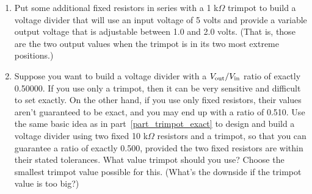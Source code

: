 \begin{enumerate}[wide]
\item Put some additional fixed resistors in series with a 1 k$\Omega$ trimpot to build a voltage divider that will use an input voltage of 5 volts and provide a variable output voltage that is adjustable between 1.0 and 2.0 volts.  (That is, those are the two output values when the trimpot is in its two most extreme positions.) \label{part_trimpot_exact}

\item Suppose you want to build a voltage divider with a $V_{\rm out}/V_{\rm in}$ ratio of exactly 0.50000.  If you use only a trimpot, then it can be very sensitive and difficult to set exactly.  On the other hand, if you use only fixed resistors, their values aren't guaranteed to be exact, and you may end up with a ratio of 0.510.  Use the same basic idea as in part~\ref{part_trimpot_exact} to design and build a voltage divider using two fixed 10 k$\Omega$ resistors and a trimpot, so that you can guarantee a ratio of exactly 0.500, provided the two fixed resistors are within their stated tolerances.  What value trimpot should you use?  Choose the smallest trimpot value possible for this.  (What's the downside if the trimpot value is too big?)  


\end{enumerate}

